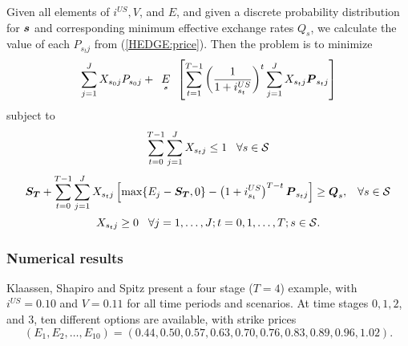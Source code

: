 Given all elements of $i^{US}, V$, and $ E$, and given a discrete probability distribution for $\mathbf{\boldsymbol{s}}$ and corresponding minimum effective exchange rates $Q_s$, we calculate the value of each $P_{s_t j}$ from (\ref{HEDGE:price}).  Then the problem is to\newline
\noindent minimize
\begin{equation*}
\sum_{j=1}^J X_{s_0 j} P_{s_0 j} + \expect[s]\left[\sum_{t=1}^{T-1}\left(\frac{1}{1+i^{US}_{s_t}}\right)^t \sum_{j=1}^J X_{s_t j} \rand{P}_{s_t j} \right]
\end{equation*}
\noindent subject to
\begin{equation*}
\sum_{t=0}^{T-1} \sum_{j=1}^{J} X_{s_t j} \leq 1 \hspace{3mm} \forall s \in \mathcal{S}
\end{equation*}
\begin{equation*}
\mathbf{\boldsymbol{S_T}} + \sum_{t=0}^{T-1} \sum_{j=1}^J X_{s_t j}\left[ \mbox{max}\{E_j - \mathbf{\boldsymbol{S_T}},0\} - \left(1+i^{US}_{s_t}\right)^{T-t}\mathbf{\boldsymbol{P}}_{s_t j}\right] \geq \mathbf{\boldsymbol{Q}}_s, \hspace{3mm} \forall s \in \mathcal{S}
\end{equation*}
\begin{equation*}
X_{s_t j} \geq 0 \hspace{3mm} \forall j=1,\ldots,J; t=0,1,\ldots,T; s\in \mathcal{S}.
\end{equation*}

\subsubsection{Numerical results}

Klaassen, Shapiro and Spitz \cite{klaassen90} present a four stage ($T=4$) example, with $i^{US}=0.10$ and $V=0.11$ for all time periods and scenarios.  At time stages $0, 1, 2$, and $3$, ten different options are available, with strike prices
\[
(E_1, E_2, \ldots, E_{10})=(0.44,0.50,0.57,0.63,0.70,0.76,0.83,0.89,0.96,1.02).
\]

